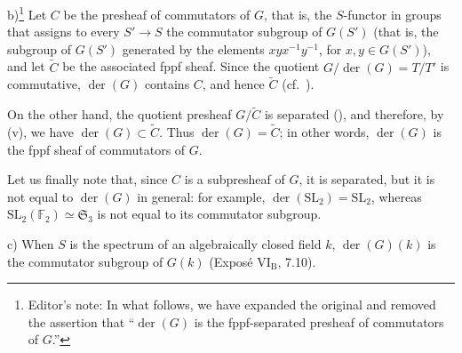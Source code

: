 \textup{b)}\footnote{Editor's note: In what follows, we have
expanded the original and removed the assertion that
``\(\operatorname{der}(G)\) is the fppf-separated presheaf of
commutators of \(G\).''}
Let \(C\) be the presheaf of commutators of \(G\), that is, the
\(S\)-functor in groups that assigns to every \(S'\to S\) the
commutator subgroup of \(G(S')\) (that is, the subgroup of
\(G(S')\) generated by the elements
\(xyx^{-1}y^{-1}\), for \(x,y\in G(S')\)), and let
\(\widetilde C\) be the associated fppf sheaf. Since the quotient
\(G/\operatorname{der}(G)=T/T'\) is commutative,
\(\operatorname{der}(G)\) contains \(C\), and hence
\(\widetilde C\) \textup{(cf.\ )}.

On the other hand, the quotient presheaf \(G/\widetilde C\) is
separated \textup{()}, and therefore, by
\textup{(v)}, we have
\(\operatorname{der}(G)\subset\widetilde C\). Thus
\(\operatorname{der}(G)=\widetilde C\); in other words,
\(\operatorname{der}(G)\) is the fppf sheaf of commutators of
\(G\).

Let us finally note that, since \(C\) is a subpresheaf of \(G\),
it is separated, but it is not equal to
\(\operatorname{der}(G)\) in general: for example,
\(\operatorname{der}(\mathrm{SL}_2)=\mathrm{SL}_2\), whereas
\(\mathrm{SL}_2(\mathbb F_2)\simeq\mathfrak S_3\) is not equal
to its commutator subgroup.

\textup{c)} When \(S\) is the spectrum of an algebraically closed
field \(k\), \(\operatorname{der}(G)(k)\) is the commutator
subgroup of \(G(k)\) \textup{(Exposé \(\mathrm{VI_B}\), 7.10)}.

